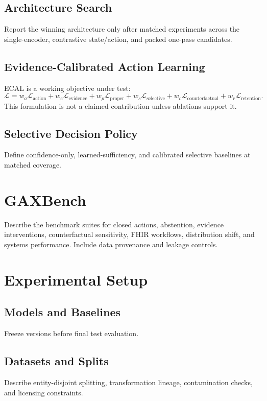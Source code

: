 \documentclass[11pt]{article}
\begin{document}
\subsection{Architecture Search}
Report the winning architecture only after matched experiments across the
single-encoder, contrastive state/action, and packed one-pass candidates.

\subsection{Evidence-Calibrated Action Learning}
ECAL is a working objective under test:
\begin{equation}
\mathcal{L} =
w_a\mathcal{L}_{\mathrm{action}} +
w_e\mathcal{L}_{\mathrm{evidence}} +
w_p\mathcal{L}_{\mathrm{proper}} +
w_s\mathcal{L}_{\mathrm{selective}} +
w_c\mathcal{L}_{\mathrm{counterfactual}} +
w_r\mathcal{L}_{\mathrm{retention}}.
\end{equation}
This formulation is not a claimed contribution unless ablations support it.

\subsection{Selective Decision Policy}
Define confidence-only, learned-sufficiency, and calibrated selective baselines
at matched coverage.

\section{GAXBench}

Describe the benchmark suites for closed actions, abstention, evidence
interventions, counterfactual sensitivity, FHIR workflows, distribution shift,
and systems performance. Include data provenance and leakage controls.

\section{Experimental Setup}

\subsection{Models and Baselines}
Freeze versions before final test evaluation.

\subsection{Datasets and Splits}
Describe entity-disjoint splitting, transformation lineage, contamination checks,
and licensing constraints.
\end{document}
